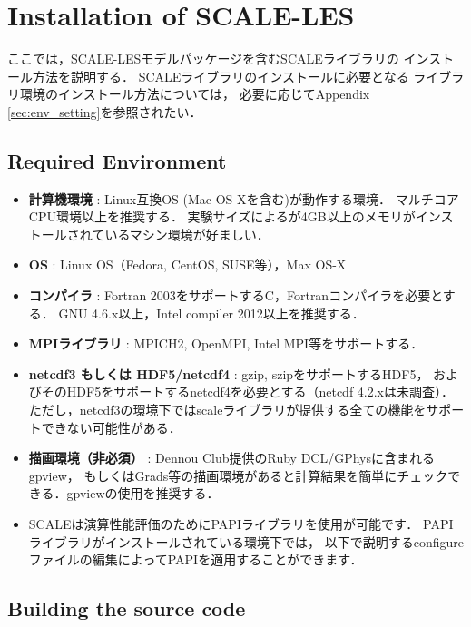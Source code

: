 \section{Installation of SCALE-LES}

ここでは，SCALE-LESモデルパッケージを含むSCALEライブラリの
インストール方法を説明する．
SCALEライブラリのインストールに必要となる
ライブラリ環境のインストール方法については，
必要に応じてAppendix \ref{sec:env_setting}を参照されたい．

\subsection{Required Environment}

\begin{itemize}
  \item {\bf 計算機環境} : Linux互換OS (Mac OS-Xを含む)が動作する環境．
        マルチコアCPU環境以上を推奨する．
        実験サイズによるが4GB以上のメモリがインストールされているマシン環境が好ましい．
  \item {\bf OS} : Linux OS（Fedora, CentOS, SUSE等），Max OS-X
  \item {\bf コンパイラ} : Fortran 2003をサポートするC，Fortranコンパイラを必要とする．
        GNU 4.6.x以上，Intel compiler 2012以上を推奨する．
  \item {\bf MPIライブラリ} : MPICH2, OpenMPI, Intel MPI等をサポートする．
  \item {\bf netcdf3 もしくは HDF5/netcdf4} : gzip, szipをサポートするHDF5，
        およびそのHDF5をサポートするnetcdf4を必要とする（netcdf 4.2.xは未調査）．
        ただし，netcdf3の環境下ではscaleライブラリが提供する全ての機能をサポートできない可能性がある．
  \item {\bf 描画環境（非必須）} : Dennou Club提供のRuby DCL/GPhysに含まれるgpview，
        もしくはGrads等の描画環境があると計算結果を簡単にチェックできる．gpviewの使用を推奨する．
  \item SCALEは演算性能評価のためにPAPIライブラリを使用が可能です．
        PAPIライブラリがインストールされている環境下では，
        以下で説明するconfigureファイルの編集によってPAPIを適用することができます．
\end{itemize}



\subsection{Building the source code}

